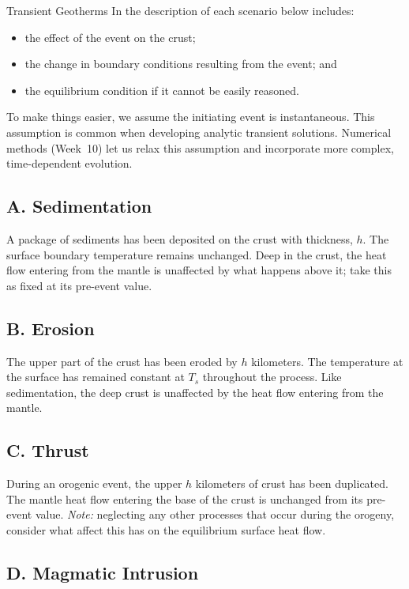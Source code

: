 \begin{activity}{Transient Geotherms}
In the description of each scenario below includes:
\begin{itemize}
  \item the effect of the event on the crust;
  \item the change in boundary conditions resulting from the event; and
  \item the equilibrium condition if it cannot be easily reasoned.
\end{itemize}

To make things easier, we assume the initiating event is instantaneous.  This assumption is common when developing analytic transient solutions.  Numerical methods (Week~10) let us relax this assumption and incorporate more complex, time-dependent evolution.

\subsection*{A. Sedimentation}

A package of sediments has been deposited on the crust with thickness, $h$.  The surface boundary temperature remains unchanged.  Deep in the crust, the heat flow entering from the mantle is unaffected by what happens above it; take this as fixed at its pre-event value.

\subsection*{B. Erosion}

The upper part of the crust has been eroded by $h$ kilometers.  The temperature at the surface has remained constant at $T_s$ throughout the process. Like sedimentation, the deep crust is unaffected by the heat flow entering from the mantle.

\subsection*{C. Thrust}

During an orogenic event, the upper $h$ kilometers of crust has been duplicated. The mantle heat flow entering the base of the crust is unchanged from its pre-event value. \emph{Note:} neglecting any other processes that occur during the orogeny, consider what affect this has on the equilibrium surface heat flow.

\subsection*{D. Magmatic Intrusion}


\end{activity}

